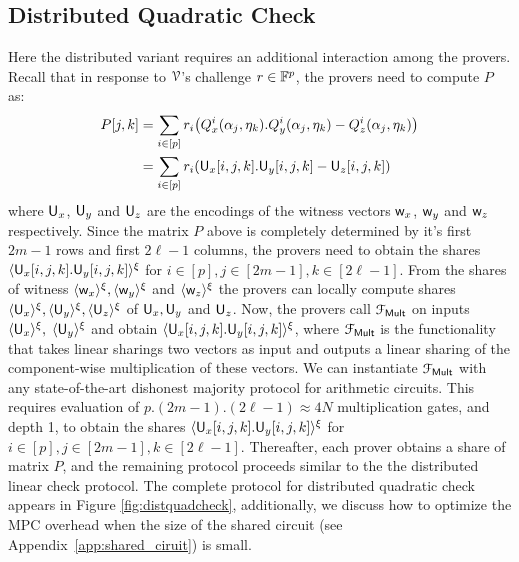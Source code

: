 \subsection{Distributed Quadratic Check} Here the distributed variant requires an additional interaction among the provers. Recall that in response to $\mathcal{V}$'s challenge $r\in \mathbb{F}^p$, the provers need to compute $P$ as:
\begin{align*}
	P[j,k] & =\sum_{i\in [p]} r_i\big(Q_x^i(\alpha_j,\eta_k).Q_y^i(\alpha_j,\eta_k)-Q_z^i(\alpha_j,\eta_k)\big)\\ 
	& = \sum_{i\in [p]}r_i(\mathsf{U}_x[i,j,k].\mathsf{U}_y[i,j,k] - \mathsf{U}_z[i,j,k])
\end{align*}    
where $\mathsf{U}_x$, $\mathsf{U}_y$ and $\mathsf{U}_z$ are the encodings of the witness
vectors $\mathsf{w}_x$, $\mathsf{w}_y$ and $\mathsf{w}_z$ respectively. 
Since the matrix $P$ above is completely determined by it's first $2m-1$ rows
and first $2\ell-1$ columns, the provers need to obtain the shares
$\langle{\mathsf{U}_x[i,j,k].\mathsf{U}_y[i,j,k]}\rangle^\xi$ for $i\in [p],j\in [2m-1],k\in [2\ell-1]$.
From the shares of witness $\langle{\mathsf{w}_x}\rangle^\xi,\langle{\mathsf{w}_y}\rangle^\xi$ and $\langle{\mathsf{w}_z}\rangle^\xi$ the
provers can locally compute shares $\langle{\mathsf{U}_x}\rangle^\xi,\langle{\mathsf{U}_y}\rangle^\xi,\langle{\mathsf{U}_z}\rangle^\xi$
of $\mathsf{U}_x,\mathsf{U}_y$ and $\mathsf{U}_z$. Now, the provers call $\mathcal{F}_{\sf Mult}$  on inputs $\langle{\mathsf{U}_x}\rangle^\xi,\; \langle{\mathsf{U}_y}\rangle^\xi$ and obtain $\langle{\mathsf{U}_x[i,j,k].\mathsf{U}_y[i,j,k]}\rangle^\xi$, where $\mathcal{F}_{\sf Mult}$ is the functionality that takes linear sharings two vectors as input and outputs a linear sharing of the component-wise multiplication of these vectors.
We can instantiate $\mathcal{F}_{\sf Mult}$ with any state-of-the-art dishonest majority protocol for arithmetic circuits.
This requires evaluation of $p.(2m-1).(2\ell-1)\approx 4N$ multiplication gates, and depth 1, to obtain the
shares $\langle{\mathsf{U}_x[i,j,k].\mathsf{U}_y[i,j,k]}\rangle^\xi$ for $i\in [p],j\in [2m-1],k\in [2\ell-1]$.
Thereafter, each prover obtains a share of matrix $P$, and the remaining protocol proceeds similar to the the distributed linear check protocol. 
The complete protocol for
distributed quadratic check appears in Figure \ref{fig:distquadcheck}, %
additionally, we discuss how to optimize the MPC overhead when the size of the shared circuit (see Appendix~\ref{app:shared_ciruit}) is small.

